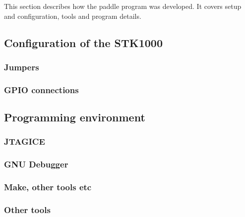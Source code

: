 This section describes how the paddle program was developed.
It covers setup and configuration, tools and program details.

\subsection{Configuration of the STK1000}

    \subsubsection{Jumpers}

        

    \subsubsection{GPIO connections}

        

\subsection{Programming environment}

    \subsubsection{JTAGICE}

        

    \subsubsection{GNU Debugger}
        

    \subsubsection{Make, other tools etc}

        

    \subsubsection{Other tools}

        

